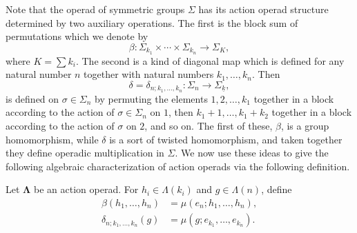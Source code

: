 \documentclass{amsbook} %
\newcommand{\ML}{\mathbf{\Lambda}}
\numberwithin{section}{chapter}
\begin{document}
Note that the operad of symmetric groups $\Sigma$ has its action operad structure determined by two auxiliary operations.  The first is the block sum of permutations which we denote by
  \[
    \beta \colon \Sigma_{k_{1}} \times \cdots \times \Sigma_{k_{n}} \rightarrow \Sigma_{K},
  \]
where $K = \sum k_{i}$.  The second is a kind of diagonal map which is defined for any natural number $n$ together with natural numbers $k_{1}, \ldots, k_{n}$.  Then
  \[
    \delta = \delta_{n; k_{1}, \ldots, k_{n}} \colon \Sigma_{n} \rightarrow \Sigma_{\underline{k}},
  \]
is defined on $\sigma \in \Sigma_{n}$ by permuting the elements $1, 2, \ldots, k_{1}$ together in a block according to the action of $\sigma \in \Sigma_{n}$ on $1$, then $k_{1}+1, \ldots, k_{1}+k_{2}$ together in a block according to the action of $\sigma$ on $2$, and so on.  The first of these, $\beta$, is a group homomorphism, while $\delta$
is a sort of twisted homomorphism, and taken together they define operadic multiplication in $\Sigma$.  We now use these ideas to give the following algebraic characterization of action operads via the following definition.

\begin{Defi}\label{Defi:aop_bl}
Let $\ML$ be an action operad. For $h_i \in \Lambda(k_i)$ and $g \in \Lambda(n)$, define
  \begin{align*}
    \beta(h_{1}, \ldots, h_{n}) &= \mu(e_n; h_{1}, \ldots, h_{n}), \\
    \delta_{n; k_{1}, \ldots, k_{n}}(g) &= \mu(g; e_{k_1}, \ldots, e_{k_n}).
  \end{align*}
\end{Defi}
\end{document}
